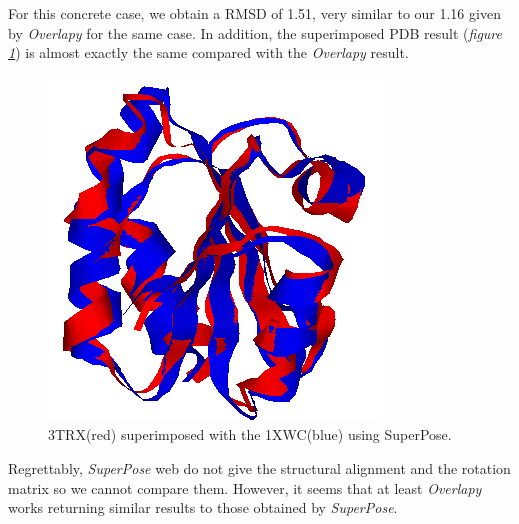 \documentclass{article}
\begin{document}
For this concrete case, we obtain a RMSD of 1.51, very similar to our 1.16 given by \textit{Overlapy} for the same case. In addition, the superimposed PDB result (\textit{figure \ref{fig:superpose}}) is almost exactly the same compared with the \textit{Overlapy} result.

\begin{figure}[!h]
	\centering
	\includegraphics[scale=0.4]{images/superpose.png}
	\caption{3TRX(red) superimposed with the 1XWC(blue) using SuperPose.}
	\label{fig:superpose}
\end{figure}

Regrettably, \textit{SuperPose} web do not give the structural alignment and the rotation matrix so we cannot compare them. However, it seems that at least \textit{Overlapy} works returning similar results to those obtained by \textit{SuperPose}. 

\pagebreak
\end{document}
